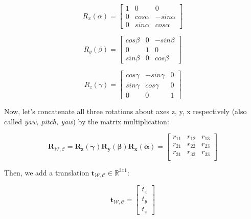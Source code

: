 \documentclass[a4paper]{report}
\numberwithin{figure}{section}
\newcommand{\R}{\mathbb{R}}
\begin{document}
\begin{equation}
  R_x(\alpha) = 
  \begin{bmatrix}
    1 & 0 & 0\\
    0 & cos\alpha & -sin\alpha\\
    0 & sin\alpha & cos\alpha
  \end{bmatrix}\label{eq:rot_matrx_x}
\end{equation} 

\begin{equation}
  R_y(\beta) = 
  \begin{bmatrix}
    cos\beta & 0 & -sin\beta\\
    0 & 1 & 0\\
    sin\beta & 0 & cos\beta
  \end{bmatrix}\label{eq:rot_matrx_y}
\end{equation} 

\begin{equation}
  R_z(\gamma) = 
  \begin{bmatrix}
    cos\gamma & -sin\gamma & 0\\
    sin\gamma & cos\gamma & 0\\
    0 & 0 & 1
  \end{bmatrix}\label{eq:rot_matrx_z}
\end{equation} 

Now, let's concatenate all three rotations about axes z, y, x respectively 
(also 
called \textit{yaw, pitch, yaw}) by the matrix multiplication:

\begin{equation}
  \mathbf{R}_{\mathcal{W}, \mathcal{C}} = 
  \mathbf{R_z(\gamma)}\mathbf{R_y(\beta)}\mathbf{R_x(\alpha)}
  =
  \begin{bmatrix}
    r_{11} & r_{12} & r_{13}\\
    r_{21} & r_{22} & r_{23}\\
    r_{31} & r_{32} & r_{33}\\
  \end{bmatrix}\label{eq:rot_matrix_derivation}
\end{equation} 

Then, we add a translation $\mathbf{t}_{\mathcal{W}, \mathcal{C}} \in 
\R^{3x1}$:

\begin{equation}
  \mathbf{t}_{\mathcal{W}, \mathcal{C}} = 
  \begin{bmatrix}
    t_x \\ t_y \\ t_z
  \end{bmatrix}\label{eq:translation}
\end{equation} 
\end{document}
